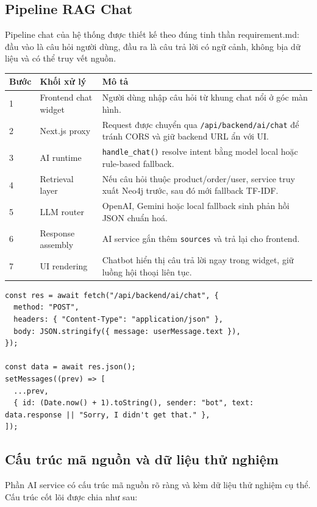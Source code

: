 \documentclass[12pt,a4paper]{article}
\begin{document}
\subsection{Pipeline RAG Chat}
Pipeline chat của hệ thống được thiết kế theo đúng tinh thần requirement.md: đầu vào là câu hỏi người dùng, đầu ra là câu trả lời có ngữ cảnh, không bịa dữ liệu và có thể truy vết nguồn.

\begin{longtable}{p{1.5cm}p{3.8cm}p{7.2cm}}
\toprule
\textbf{Bước} & \textbf{Khối xử lý} & \textbf{Mô tả} \\
\midrule
1 & Frontend chat widget & Người dùng nhập câu hỏi từ khung chat nổi ở góc màn hình. \\
2 & Next.js proxy & Request được chuyển qua \texttt{/api/backend/ai/chat} để tránh CORS và giữ backend URL ẩn với UI. \\
3 & AI runtime & \texttt{handle\_chat()} resolve intent bằng model local hoặc rule-based fallback. \\
4 & Retrieval layer & Nếu câu hỏi thuộc product/order/user, service truy xuất Neo4j trước, sau đó mới fallback TF-IDF. \\
5 & LLM router & OpenAI, Gemini hoặc local fallback sinh phản hồi JSON chuẩn hoá. \\
6 & Response assembly & AI service gắn thêm \texttt{sources} và trả lại cho frontend. \\
7 & UI rendering & Chatbot hiển thị câu trả lời ngay trong widget, giữ luồng hội thoại liên tục. \\
\bottomrule
\end{longtable}

\begin{lstlisting}[style=code,caption={Luồng gửi chat từ frontend tới AI service}]
const res = await fetch("/api/backend/ai/chat", {
  method: "POST",
  headers: { "Content-Type": "application/json" },
  body: JSON.stringify({ message: userMessage.text }),
});

const data = await res.json();
setMessages((prev) => [
  ...prev,
  { id: (Date.now() + 1).toString(), sender: "bot", text: data.response || "Sorry, I didn't get that." },
]);
\end{lstlisting}

\subsection{Cấu trúc mã nguồn và dữ liệu thử nghiệm}
Phần AI service có cấu trúc mã nguồn rõ ràng và kèm dữ liệu thử nghiệm cụ thể. Cấu trúc cốt lõi được chia như sau:
\end{document}
